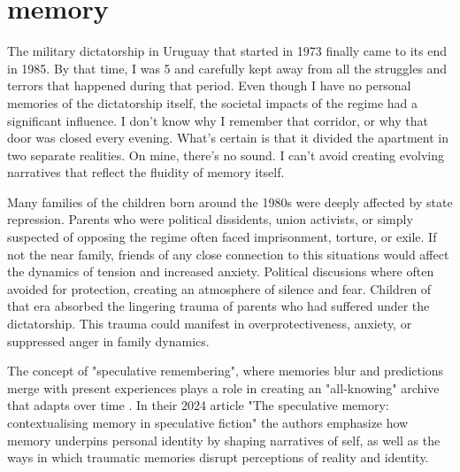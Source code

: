 \chapter*{memory}
\begin{center}
\vspace{2cm}
\begin{flushright}
\large
\end{flushright}
\vspace{2cm}
\end{center}
\normalsize

\newpage  %
The military dictatorship in Uruguay that started in 1973 finally came to its end in 1985. By that time, I was 5 and carefully kept away from all the struggles and terrors that happened during that period. Even though I have no personal memories of the dictatorship itself, the societal impacts of the regime had a significant influence. I don't know why I remember that corridor, or why that door was closed every evening. What's certain is that it divided the apartment in two separate realities. On mine, there's no sound. I can't avoid creating evolving narratives that reflect the fluidity of memory itself. 

Many families of the children born around the 1980s were deeply affected by state repression. Parents who were political dissidents, union activists, or simply suspected of opposing the regime often faced imprisonment, torture, or exile. If not the near family, friends of any close connection to this situations would affect the dynamics of tension and increased anxiety. Political discusions where often avoided for protection, creating an atmosphere of silence and fear. Children of that era absorbed the lingering trauma of parents who had suffered under the dictatorship. This trauma could manifest in overprotectiveness, anxiety, or suppressed anger in family dynamics.

The concept of "speculative remembering", where memories blur and predictions merge with present experiences plays a role in creating an "all-knowing" archive that adapts over time \citep{dutt2024}. In their 2024 article "The speculative memory: contextualising memory in speculative fiction" the authors emphasize how memory underpins personal identity by shaping narratives of self, as well as the ways in which traumatic memories disrupt perceptions of reality and identity.  

